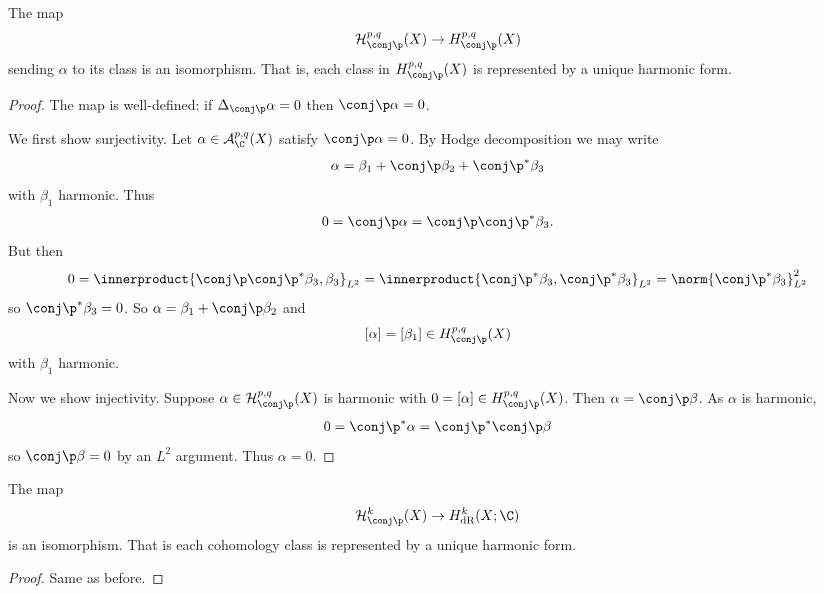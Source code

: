 \documentclass[a4paper]{article}
\newcommand*{\ip}{\innerproduct}
\begin{document}
\begin{corollary}
  The map
  \[
    \mathcal H_{\conj \p}^{p, q}(X) \to H_{\conj \p}^{p, q}(X)
  \]
  sending \(\alpha\) to its class is an isomorphism. That is, each class in \(H_{\conj \p}^{p, q}(X)\) is represented by a unique harmonic form.
\end{corollary}

\begin{proof}
  The map is well-defined: if \(\Delta_{\conj \p} \alpha = 0\) then \(\conj \p \alpha = 0\).

  We first show surjectivity. Let \(\alpha \in \mathcal A_\C^{p, q}(X)\) satisfy \(\conj \p \alpha = 0\). By Hodge decomposition we may write
  \[
    \alpha = \beta_1 + \conj \p \beta_2 + \conj \p^* \beta_3
  \]
  with \(\beta_1\) harmonic. Thus
  \[
    0 = \conj \p \alpha = \conj \p \conj \p^* \beta_3.
  \]
  But then
  \[
    0
    = \ip{\conj \p \conj \p^* \beta_3, \beta_3}_{L^2}
    = \ip{\conj \p^* \beta_3, \conj \p^* \beta_3}_{L^2}
    = \norm{\conj \p^* \beta_3}_{L^2}^2
  \]
  so \(\conj \p^* \beta_3 = 0\). So \(\alpha = \beta_1 + \conj \p \beta_2\) and
  \[
    [\alpha] = [\beta_1] \in H_{\conj \p}^{p, q}(X)
  \]
  with \(\beta_1\) harmonic.

  Now we show injectivity. Suppose \(\alpha \in \mathcal H_{\conj \p}^{p, q}(X)\) is harmonic with \(0 = [\alpha] \in H_{\conj \p}^{p, q}(X)\). Then \(\alpha = \conj \p \beta\). As \(\alpha\) is harmonic,
  \[
    0 = \conj \p^* \alpha = \conj \p^* \conj \p \beta
  \]
  so \(\conj \p \beta = 0\) by an \(L^2\) argument. Thus \(\alpha = 0\).
\end{proof}

\begin{corollary}
  The map
  \[
    \mathcal H_{\conj \p} ^k(X) \to H_{\textrm{dR}}^k(X; \C)
  \]
  is an isomorphism. That is each cohomology class is represented by a unique harmonic form.
\end{corollary}

\begin{proof}
  Same as before.
\end{proof}
\end{document}
